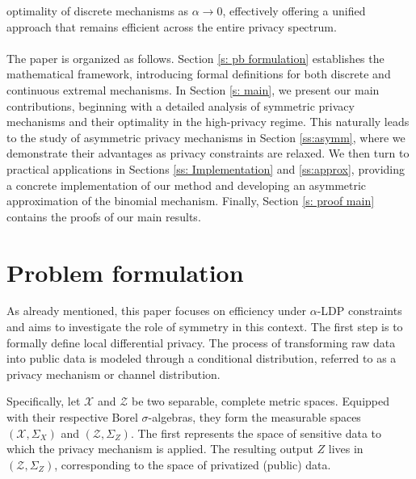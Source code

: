 \documentclass[a4paper, 11pt]{article}
\theoremstyle{definition}
\begin{document}
{optimality of discrete mechanisms as \(\alpha \to 0\), effectively offering a unified approach that remains efficient across the entire privacy spectrum. \\
\\
The paper is organized as follows. Section \ref{s: pb formulation} establishes the mathematical framework, introducing formal definitions for both discrete and continuous extremal mechanisms. In Section \ref{s: main}, we present our main contributions, beginning with a detailed analysis of symmetric privacy mechanisms and their optimality in the high-privacy regime. This naturally leads to the study of asymmetric privacy mechanisms in Section \ref{ss:asymm}, where we demonstrate their advantages as privacy constraints are relaxed. We then turn to practical applications in Sections \ref{ss: Implementation} and \ref{ss:approx}, providing a concrete implementation of our method and developing an asymmetric approximation of the binomial mechanism. Finally, Section \ref{s: proof main} contains the proofs of our main results.








\section{Problem formulation}{\label{s: pb formulation}}

As already mentioned, this paper focuses on efficiency under $\alpha$-LDP constraints and aims to investigate the role of symmetry in this context. The first step is to formally define local differential privacy. The process of transforming raw data into public data is modeled through a conditional distribution, referred to as a privacy mechanism or channel distribution.  

Specifically, let $\mathcal{X}$ and $\mathcal{Z}$ be two separable, complete metric spaces. Equipped with their respective Borel $\sigma$-algebras, they form the measurable spaces $(\mathcal{X}, \Sigma_X)$ and $(\mathcal{Z}, \Sigma_Z)$. The first represents the space of sensitive data to which the privacy mechanism is applied. The resulting output $Z$ lives in $(\mathcal{Z}, \Sigma_Z)$, corresponding to the space of privatized (public) data.  

}
\end{document}

